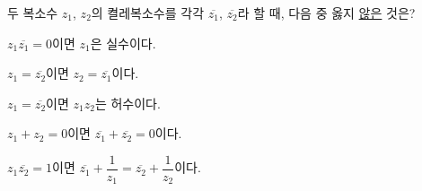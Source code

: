 두 복소수 $z_1$, $z_2$의 켤레복소수를 각각 $\overline{z_1}$, $\overline{z_2}$라 할 때, 다음 중 옳지 \underline{않은} 것은?
\begin{choicesv}{\rule[-3ex]{0pt}{8ex}$z_1\overline{z_1}=0$이면 $z_1$은 실수이다.}{\rule[-3ex]{0pt}{8ex}$z_1=\overline{z_2}$이면 $z_2=\overline{z_1}$이다.}{\rule[-3ex]{0pt}{8ex}$z_1=\overline{z_2}$이면 $z_1z_2$는 허수이다.}{\rule[-3ex]{0pt}{8ex}$z_1+z_2=0$이면 $\overline{z_1}+\overline{z_2}=0$이다.}{\rule[-3ex]{0pt}{8ex}$z_1\overline{z_2}=1$이면 $\overline{z_1}+\dfrac{1}{z_1}=\overline{z_2}+\dfrac{1}{z_2}$이다.}\end{choicesv}
